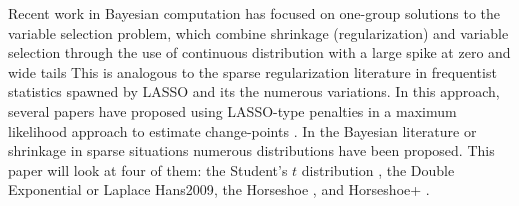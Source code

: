 Recent work in Bayesian computation has focused on one-group solutions to the variable selection problem, which combine shrinkage (regularization) and variable selection through the use of continuous distribution with a large spike at zero and wide tails \parencite{}
This is analogous to the sparse regularization literature in frequentist statistics spawned by LASSO \parencite{Tibshirani1996} and its the numerous variations.
In this approach, several papers have proposed using LASSO-type penalties in a maximum likelihood approach to estimate change-points \parencites{TibshiraniEtAl2005}{HarchaouiLevy-Leduc2010}{ChanYauZhang2014}.
In the Bayesian literature or shrinkage in sparse situations numerous distributions have been proposed. 
This paper will look at four of them: the Student's $t$ distribution \parencite{Tipping2001}, the Double Exponential or Laplace \parencite{ParkCasella2008}{Hans2009}, the Horseshoe \parencite{CarvalhoPolsonScott2010}, and Horseshoe+ \parencite{BhadraDattaPolsonEtAl2015a}.


